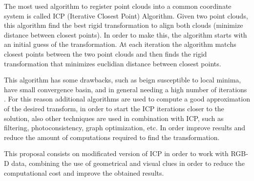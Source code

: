 
The most used algorithm to register point clouds into a common coordinate 
system is called 
ICP (Iterative Closest Point) Algorithm. Given two point clouds, 
this algorithm find the best rigid transformation to align both clouds 
(minimize distance between closest points). In order to make this, 
the algorithm starts with an initial guess of the transformation. 
At each iteration the algorithm matchs closest points between the two point clouds  and then 
finds the rigid transformation that minimizes euclidian distance between closest points.

This algorithm has some drawbacks, such as beign susceptible to local minima, 
have small convergence basin, and in general needing a high number of iterations \cite{Rusu2009}. For this reason additional 
algorithms are used to compute a good approximation of the desired transform, in order to start the ICP iterations closer to the solution, also
 other techniques are used in combination with ICP, such as filtering, photoconsistency, graph optimization, etc. In order improve results and 
reduce the amount of computations required to find the transformation.


This proposal consists on modificated version of ICP in order to work with RGB-D data, combining the use of geometrical and visual clues in 
order to reduce the computational cost and improve the obtained results.
